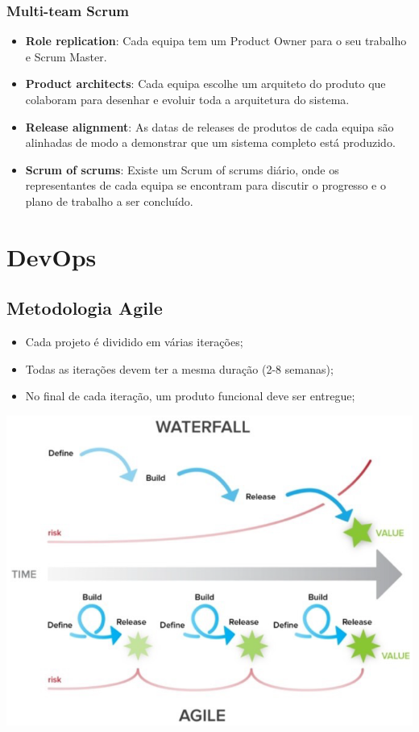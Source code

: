 \documentclass{article}
\begin{document}
\subsubsection{Multi-team Scrum}

\begin{itemize}
  \item \textbf{Role replication}: Cada equipa tem um Product Owner para o
  seu trabalho e Scrum Master.

  \item \textbf{Product architects}: Cada equipa escolhe um arquiteto
  do produto que colaboram para desenhar e evoluir toda a arquitetura
  do sistema.

  \item \textbf{Release alignment}: As datas de releases de produtos
  de cada equipa são alinhadas de modo a demonstrar que um sistema
  completo está produzido.

  \item \textbf{Scrum of scrums}: Existe um Scrum of scrums diário, onde
  os representantes de cada equipa se encontram para discutir o progresso
  e o plano de trabalho a ser concluído.
\end{itemize}

\pagebreak

\section{DevOps}

\subsection{Metodologia Agile}

\begin{itemize}
  \item Cada projeto é dividido em várias iterações;
  \item Todas as iterações devem ter a mesma duração (2-8 semanas);
  \item No final de cada iteração, um produto funcional deve ser entregue;
\end{itemize}

\begin{center}
  \includegraphics[scale=0.45]{33}
\end{center}
\end{document}
